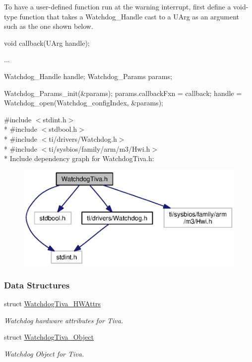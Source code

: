 To have a user-\/defined function run at the warning interrupt, first define a void-\/type function that takes a Watchdog\+\_\+\+Handle cast to a U\+Arg as an argument such as the one shown below.


\begin{DoxyCode}
\textcolor{keywordtype}{void} callback(UArg handle);

...

Watchdog\_Handle handle;
Watchdog_Params params;

Watchdog_Params_init(&params);
params.callbackFxn = callback;
handle = Watchdog_open(Watchdog\_configIndex, &params);
\end{DoxyCode}


{\ttfamily \#include $<$stdint.\+h$>$}\\*
{\ttfamily \#include $<$stdbool.\+h$>$}\\*
{\ttfamily \#include $<$ti/drivers/\+Watchdog.\+h$>$}\\*
{\ttfamily \#include $<$ti/sysbios/family/arm/m3/\+Hwi.\+h$>$}\\*
Include dependency graph for Watchdog\+Tiva.\+h\+:
\nopagebreak
\begin{figure}[H]
\begin{center}
\leavevmode
\includegraphics[width=350pt]{_watchdog_tiva_8h__incl}
\end{center}
\end{figure}
\subsubsection*{Data Structures}
\begin{DoxyCompactItemize}
\item 
struct \hyperlink{struct_watchdog_tiva___h_w_attrs}{Watchdog\+Tiva\+\_\+\+H\+W\+Attrs}
\begin{DoxyCompactList}\small\item\em Watchdog hardware attributes for Tiva. \end{DoxyCompactList}\item 
struct \hyperlink{struct_watchdog_tiva___object}{Watchdog\+Tiva\+\_\+\+Object}
\begin{DoxyCompactList}\small\item\em Watchdog Object for Tiva. \end{DoxyCompactList}\end{DoxyCompactItemize}
